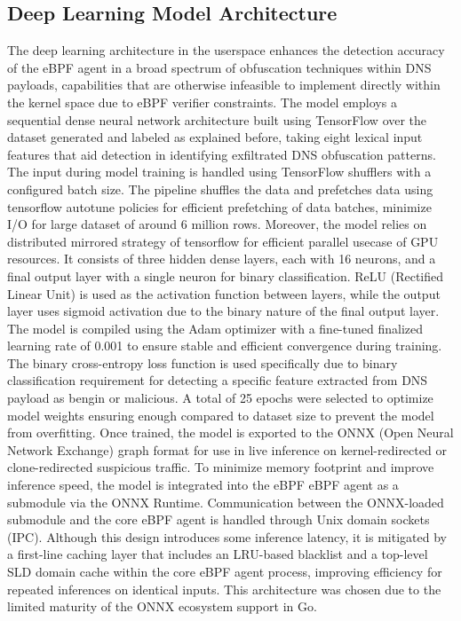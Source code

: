 \documentclass [11pt, proquest] {uwthesis}[2020/02/24]
\begin{document}
\subsection{Deep Learning Model Architecture}
\label{sec:ml}
The deep learning architecture in the userspace enhances the detection accuracy of the eBPF agent in a broad spectrum of obfuscation techniques within DNS payloads, capabilities that are otherwise infeasible to implement directly within the kernel space due to eBPF verifier constraints. The model employs a sequential dense neural network architecture built using TensorFlow over the dataset generated and labeled as explained before, taking eight lexical input features that aid detection in identifying exfiltrated DNS obfuscation patterns. The input during model training is handled using TensorFlow shufflers with a configured batch size. The pipeline shuffles the data and prefetches data using tensorflow autotune policies for efficient prefetching of data batches, minimize I/O for large dataset of around 6 million rows. Moreover, the model relies on distributed mirrored strategy of tensorflow for efficient parallel usecase of GPU resources.
It consists of three hidden dense layers, each with 16 neurons, and a final output layer with a single neuron for binary classification. ReLU (Rectified Linear Unit) is used as the activation function between layers, while the output layer uses sigmoid activation due to the binary nature of the final output layer. The model is compiled using the Adam optimizer with a fine-tuned finalized learning rate of 0.001 to ensure stable and efficient convergence during training. The binary cross-entropy loss function is used specifically due to binary classification requirement for detecting a specific feature extracted from DNS payload as bengin or malicious. A total of 25 epochs were selected to optimize model weights ensuring enough compared to dataset size to prevent the model from overfitting. 
Once trained, the model is exported to the ONNX (Open Neural Network Exchange) graph format for use in live inference on kernel-redirected or clone-redirected suspicious traffic. To minimize memory footprint and improve inference speed, the model is integrated into the eBPF eBPF agent as a submodule via the ONNX Runtime. Communication between the ONNX-loaded submodule and the core eBPF agent is handled through Unix domain sockets (IPC). Although this design introduces some inference latency, it is mitigated by a first-line caching layer that includes an LRU-based blacklist and a top-level SLD domain cache within the core eBPF agent process, improving efficiency for repeated inferences on identical inputs. This architecture was chosen due to the limited maturity of the ONNX ecosystem support in Go.
\end{document}
